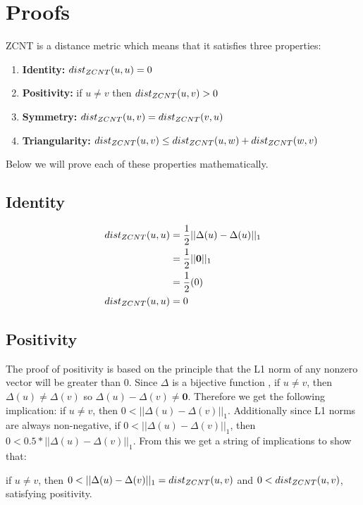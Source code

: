 \section{Proofs}

ZCNT is a distance metric \cite{zcnt_paper} which means that it satisfies three properties: 

\begin{enumerate}
    \item {\bf Identity:} $dist_{ZCNT} (u, u) = 0$
    \item {\bf Positivity:} if $u \neq v$ then $dist_{ZCNT} (u, v) > 0$
    \item {\bf Symmetry:} $dist_{ZCNT} (u, v) = dist_{ZCNT} (v, u)$
    \item {\bf Triangularity:} $dist_{ZCNT} (u, v) \leq dist_{ZCNT} (u, w) + dist_{ZCNT} (w, v)$
\end{enumerate}

Below we will prove each of these properties mathematically. 

\subsection{Identity}

\begin{align*}
    dist_{ZCNT} (u, u) &= \frac{1}{2} || \Delta(u) - \Delta(u) ||_1 \\ 
    &= \frac{1}{2} || \mathbf 0 ||_1 \\ 
    &= \frac{1}{2} (0) \\ 
    dist_{ZCNT} (u, u) &= 0 
\end{align*}

\subsection{Positivity}

The proof of positivity is based on the principle that the L1 norm of any nonzero vector will be greater than 0. Since $\Delta$ is a bijective function \cite{zcnt_paper}, if $u \neq v$, then $\Delta(u) \neq \Delta(v)$ so $\Delta(u) - \Delta(v) \neq \mathbf 0$. Therefore we get the following implication: if $u \neq v$, then $0 < ||\Delta(u) - \Delta(v)||_1$. Additionally since L1 norms are always non-negative, if $0 < ||\Delta(u) - \Delta(v)||_1$, then $0 < 0.5*||\Delta(u) - \Delta(v)||_1$. From this we get a string of implications to show that: 

\vspace{10pt}

if $u \neq v$, then $0 < ||\Delta(u) - \Delta(v)||_1 = dist_{ZCNT}(u, v)$ and $0 < dist_{ZCNT}(u, v)$, satisfying positivity. 

